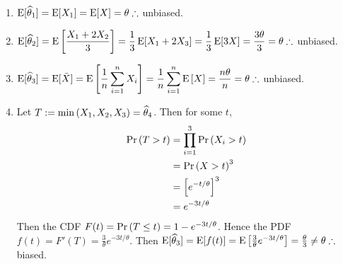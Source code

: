 \begin{enumerate}[label=$\that_\arabic*$]
    \item \soln* $\Eb*{\that_1} = \Eb*{X_1} = \Eb*{X} = \theta \therefore$ unbiased.
    \item \soln* $\Eb*{\that_2} = \Eb{ \dfrac{X_1 + 2X_2}{3}} = \over*{3}\Eb*{X_1 + 2X_3} = \over*{3}\Eb*{3X} = \dfrac{3\theta}{3} = \theta \therefore$ unbiased.
    \item \soln* $\Eb*{\that_3} = \Eb*{\Xbar} = \Eb{\over*{n}\displaystyle \sum_{i=1}^n X_i} = \over*{n} \displaystyle \sum_{i=1}^n \Eb{X} = \dfrac{n\theta}{n} = \theta \therefore$ unbiased.
    \item \soln* Let $T := \operatorname{min}\left( X_1, X_2, X_3 \right) = \widehat{\theta}_4$. Then for some $t$,
    \begin{align*}
        \P{T > t} &= \prod_{i=1}^{3} \P{X_i > t} \\ &= \P{X > t}^3 \\ &= \brac{e^{-t/\theta}}^3 \\ &= e^{-3t/\theta}
    \end{align*}
    Then the CDF $F(t) = \P{T \leq t} = 1 - e^{-3t/\theta}$. Hence the PDF $f(t) = F'(T) = \frac{3}{\theta}e^{-3t/\theta}$. Then $\Eb*{\that_3} = \Eb*{f(t)} = \Eb{ \frac{3}{\theta}e^{-3t/\theta}} = \frac{\theta}{3} \neq \theta \therefore$ biased.
\end{enumerate}